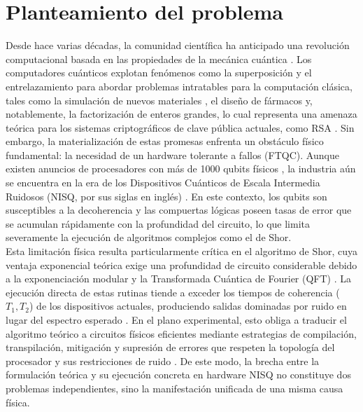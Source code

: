 \documentclass[12pt, spanish]{book}
\begin{document}
\chapter{Planteamiento del problema}

Desde hace varias décadas, la comunidad científica ha anticipado una revolución
computacional basada en las propiedades de la mecánica cuántica \cite{Hidary2021,Singh2016}.
Los computadores cuánticos explotan fenómenos como la superposición y el
entrelazamiento \cite{Norsen2017,Zettili2009} para abordar problemas
intratables para la computación clásica, tales como la simulación de nuevos materiales
\cite{Ma2020}, el diseño de fármacos \cite{Kumar2024} y, notablemente, la
factorización de enteros grandes, lo cual representa una amenaza teórica para
los sistemas criptográficos de clave pública actuales, como RSA
\cite{Buchanan2017, Harrow2017}. Sin embargo, la materialización de estas promesas enfrenta un obstáculo
físico fundamental: la necesidad de un hardware tolerante a fallos (FTQC).
Aunque existen anuncios de procesadores con más de 1000 qubits físicos
\cite{AbuGhanem2025}, la industria aún se encuentra en la era de los Dispositivos
Cuánticos de Escala Intermedia Ruidosos (NISQ, por sus siglas en inglés)
\cite{IBM20251,AbuGhanem2025}. En este contexto, los qubits son susceptibles
a la decoherencia y las compuertas lógicas poseen tasas de error que se
acumulan rápidamente con la profundidad del circuito, lo que limita severamente
la ejecución de algoritmos complejos como el de Shor.\\

Esta limitación física resulta particularmente crítica en el algoritmo de Shor,
cuya ventaja exponencial teórica exige una profundidad de circuito considerable
debido a la exponenciación modular y la Transformada Cuántica de Fourier
(QFT) \cite{villarreal}. La ejecución directa de estas rutinas tiende a
exceder los tiempos de coherencia ($T_{1}, T_{2}$) de los dispositivos
actuales, produciendo salidas dominadas por ruido en lugar del espectro
esperado \cite{villarreal, Skosana2021}. En el plano experimental, esto
obliga a traducir el algoritmo teórico a circuitos físicos eficientes mediante
estrategias de compilación, transpilación, mitigación y supresión de errores que respeten
la topología del procesador y sus restricciones de ruido \cite{CLASSICQ2025}.
De este modo, la brecha entre la formulación teórica y su ejecución concreta
en hardware NISQ no constituye dos problemas independientes, sino la
manifestación unificada de una misma causa física.\\
\end{document}
